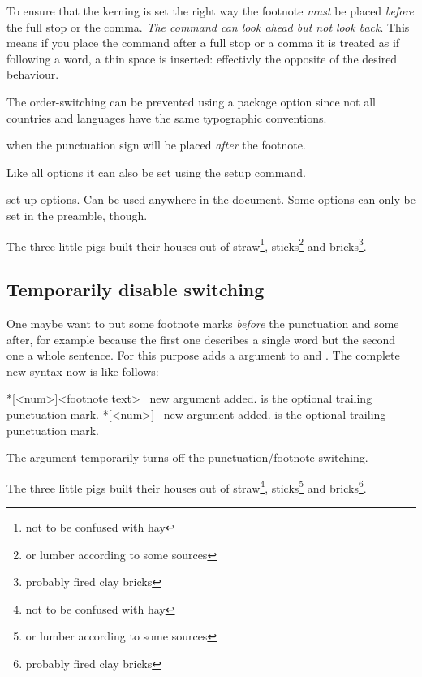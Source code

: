 \documentclass[toc=index,toc=bib]{cnpkgdoc}
\begin{document}
To ensure that the kerning is set the right way the footnote \emph{must} be placed
\emph{before} the full stop or the comma. \emph{The command can look ahead but not look back}.
This means if you place the  command after a full stop or a comma it is
treated as if following a word, \ie a thin space is inserted: effectivly the opposite 
of the desired behaviour.

The order-switching can be prevented using a package option since not all countries
and languages have the same typographic conventions.
\begin{beschreibung}
  when  the punctuation sign
 will be placed \emph{after} the footnote.
\end{beschreibung}
Like all options it can also be set using the setup command.
\begin{beschreibung}
  set up options. Can be used anywhere in the document.
 Some options can only be set in the preamble, though.
\end{beschreibung}
\begin{beispiel}
 \begin{minipage}{.4\linewidth}
  \noindent The three little pigs built their houses
  out of straw\footnote{not to be confused with hay},
  sticks\footnote{or lumber according to some sources}
  and bricks\footnote{probably fired clay bricks}.
 \end{minipage}
\end{beispiel}

\subsection{Temporarily disable switching}
One maybe want to put some footnote marks \emph{before} the punctuation and some
after, for example because the first one describes a single word but the second
one a whole sentence. For this purpose \fnpct adds a \code{*} argument to 
and . The complete new syntax now is like follows:
\begin{beschreibung}
 *[<num>]{<footnote text>} \cnpkgdocarrow\ new
 \code{*} argument added.  is the optional trailing punctuation
 mark.
 *[<num>] \cnpkgdocarrow\ new \code{*} argument
 added.  is the optional trailing punctuation mark.
\end{beschreibung}
The \code{*} argument temporarily turns off the punctuation/footnote switching.
\begin{beispiel}
 \begin{minipage}{.4\linewidth}
  \noindent The three little pigs built their houses
  out of straw\footnote*{not to be confused with hay},
  sticks\footnote{or lumber according to some sources}
  and bricks\footnote{probably fired clay bricks}.
 \end{minipage}
\end{beispiel}
\end{document}
